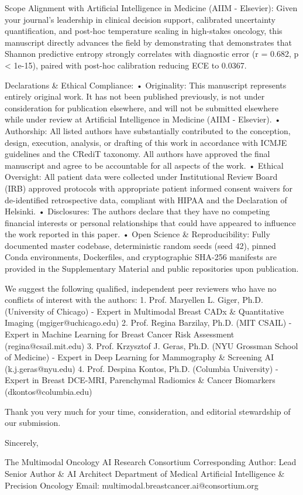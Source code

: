 \documentclass[11pt]{article}
\begin{document}
Scope Alignment with Artificial Intelligence in Medicine (AIIM - Elsevier):
Given your journal's leadership in clinical decision support, calibrated uncertainty quantification, and post-hoc temperature scaling in high-stakes oncology, this manuscript directly advances the field by demonstrating that demonstrates that Shannon predictive entropy strongly correlates with diagnostic error (r = 0.682, p < 1e-15), paired with post-hoc calibration reducing ECE to 0.0367.

Declarations \& Ethical Compliance:
• Originality: This manuscript represents entirely original work. It has not been published previously, is not under consideration for publication elsewhere, and will not be submitted elsewhere while under review at Artificial Intelligence in Medicine (AIIM - Elsevier).
• Authorship: All listed authors have substantially contributed to the conception, design, execution, analysis, or drafting of this work in accordance with ICMJE guidelines and the CRediT taxonomy. All authors have approved the final manuscript and agree to be accountable for all aspects of the work.
• Ethical Oversight: All patient data were collected under Institutional Review Board (IRB) approved protocols with appropriate patient informed consent waivers for de-identified retrospective data, compliant with HIPAA and the Declaration of Helsinki.
• Disclosures: The authors declare that they have no competing financial interests or personal relationships that could have appeared to influence the work reported in this paper.
• Open Science \& Reproducibility: Fully documented master codebase, deterministic random seeds (seed 42), pinned Conda environments, Dockerfiles, and cryptographic SHA-256 manifests are provided in the Supplementary Material and public repositories upon publication.

We suggest the following qualified, independent peer reviewers who have no conflicts of interest with the authors:
1. Prof. Maryellen L. Giger, Ph.D. (University of Chicago) - Expert in Multimodal Breast CADx \& Quantitative Imaging (mgiger@uchicago.edu)
2. Prof. Regina Barzilay, Ph.D. (MIT CSAIL) - Expert in Machine Learning for Breast Cancer Risk Assessment (regina@csail.mit.edu)
3. Prof. Krzysztof J. Geras, Ph.D. (NYU Grossman School of Medicine) - Expert in Deep Learning for Mammography \& Screening AI (k.j.geras@nyu.edu)
4. Prof. Despina Kontos, Ph.D. (Columbia University) - Expert in Breast DCE-MRI, Parenchymal Radiomics \& Cancer Biomarkers (dkontos@columbia.edu)

Thank you very much for your time, consideration, and editorial stewardship of our submission.

Sincerely,

The Multimodal Oncology AI Research Consortium
Corresponding Author: Lead Senior Author \& AI Architect
Department of Medical Artificial Intelligence \& Precision Oncology
Email: multimodal.breastcancer.ai@consortium.org
\end{document}
